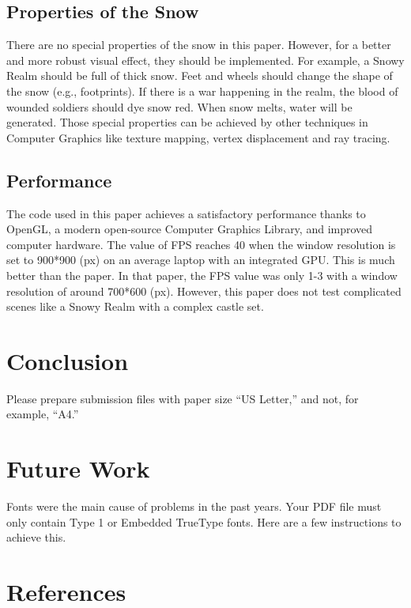 \documentclass{article}
\begin{document}
\subsection {Properties of the Snow}
There are no special properties of the snow in this paper. However, for a better and more robust visual effect, they should be 
implemented. For example, a Snowy Realm should be full of thick snow. Feet and wheels should change the shape of the snow (e.g.,
footprints). If there is a war happening in the realm, the blood of wounded soldiers should dye snow red. When snow melts, water 
will be generated. Those special properties can be achieved by other techniques in Computer Graphics like texture mapping, vertex
displacement and ray tracing.

\subsection {Performance}
The code used in this paper achieves a satisfactory performance thanks to OpenGL, a modern open-source Computer Graphics Library, 
and improved computer hardware. The value of FPS reaches 40 when the window resolution is set to 900*900 (px) on an average laptop 
with an integrated GPU. This is much better than the paper. In that paper, the FPS value was only 1-3 with a window resolution of 
around 700*600 (px). However, this paper does not test complicated scenes like a Snowy Realm with a complex castle set.

\section{Conclusion}
Please prepare submission files with paper size ``US Letter,'' and not, for
example, ``A4.''

\section{Future Work}

Fonts were the main cause of problems in the past years. Your PDF file must only
contain Type 1 or Embedded TrueType fonts. Here are a few instructions to
achieve this.


\section*{References}
\end{document}
